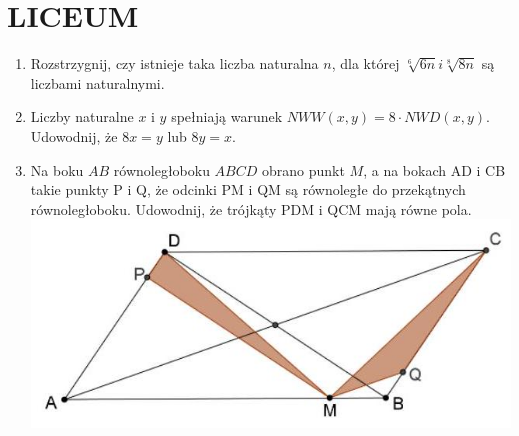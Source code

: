 \documentclass[10pt]{article}
\begin{document}
\section*{LICEUM}
\begin{enumerate}
  \item Rozstrzygnij, czy istnieje taka liczba naturalna \(n\), dla której \(\sqrt[6]{6 n} i \sqrt[8]{8 n}\) są liczbami naturalnymi.
  \item Liczby naturalne \(x\) i \(y\) spełniają warunek \(N W W(x, y)=8 \cdot N W D(x, y)\). Udowodnij, że \(8 x=y\) lub \(8 y=x\).
  \item Na boku \(A B\) równoległoboku \(A B C D\) obrano punkt \(M\), a na bokach AD i CB takie punkty P i Q, że odcinki PM i QM są równoległe do przekątnych równoległoboku. Udowodnij, że trójkąty PDM i QCM mają równe pola.\\
\includegraphics[max width=\textwidth, center]{2024_11_21_6a3dc3e3d38c7fac1bfbg-1}
\end{enumerate}
\end{document}
